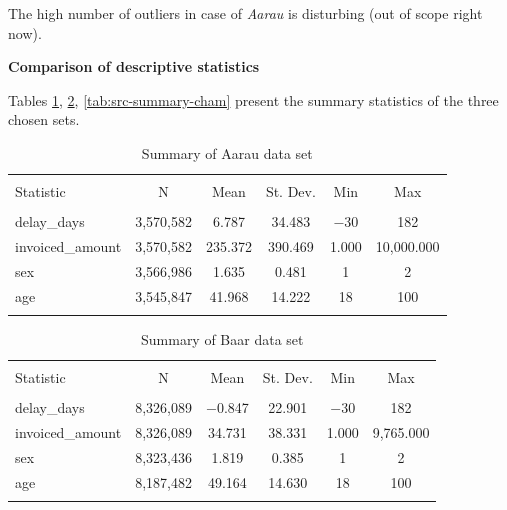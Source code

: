\documentclass{article}
\begin{document}
The high number of outliers in case of \textit{Aarau} is disturbing (out of scope right now).\par

\vspace{10pt}

\textbf{Comparison of descriptive statistics}

Tables \ref{tab:src-summary-aarau}, \ref{tab:src-summary-baar}, \ref{tab:src-summary-cham} present the summary statistics of the three chosen sets.

\begin{table}[!htbp] \centering
  \caption{Summary of Aarau data set}
  \label{tab:src-summary-aarau}
\begin{tabular}{@{\extracolsep{5pt}}lccccc}
\\[-1.8ex]\hline
\hline \\[-1.8ex]
Statistic & \multicolumn{1}{c}{N} & \multicolumn{1}{c}{Mean} & \multicolumn{1}{c}{St. Dev.} & \multicolumn{1}{c}{Min} & \multicolumn{1}{c}{Max} \\
\hline \\[-1.8ex]
delay\_days & 3,570,582 & 6.787 & 34.483 & $-$30 & 182 \\
invoiced\_amount & 3,570,582 & 235.372 & 390.469 & 1.000 & 10,000.000 \\
sex & 3,566,986 & 1.635 & 0.481 & 1 & 2 \\
age & 3,545,847 & 41.968 & 14.222 & 18 & 100 \\
\hline \\[-1.8ex]
\end{tabular}
\end{table}

\begin{table}[!htbp] \centering
  \caption{Summary of Baar data set}
  \label{tab:src-summary-baar}
\begin{tabular}{@{\extracolsep{5pt}}lccccc}
\\[-1.8ex]\hline
\hline \\[-1.8ex]
Statistic & \multicolumn{1}{c}{N} & \multicolumn{1}{c}{Mean} & \multicolumn{1}{c}{St. Dev.} & \multicolumn{1}{c}{Min} & \multicolumn{1}{c}{Max} \\
\hline \\[-1.8ex]
delay\_days & 8,326,089 & $-$0.847 & 22.901 & $-$30 & 182 \\
invoiced\_amount & 8,326,089 & 34.731 & 38.331 & 1.000 & 9,765.000 \\
sex & 8,323,436 & 1.819 & 0.385 & 1 & 2 \\
age & 8,187,482 & 49.164 & 14.630 & 18 & 100 \\
\hline \\[-1.8ex]
\end{tabular}
\end{table}
\end{document}
